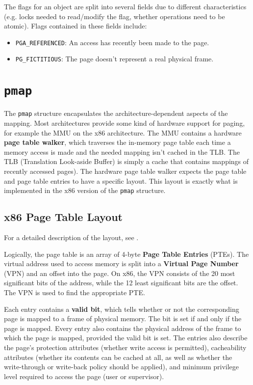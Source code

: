 \documentclass[shortabstract, english]{iithesis}
\begin{document}
The flags for an object are split into several fields due to different
characteristics (e.g. locks needed to read/modify the flag, whether operations
need to be atomic). Flags contained in these fields include:

\begin{itemize}
  \item \texttt{PGA_REFERENCED}: An access has recently been made to the page.
  \item \texttt{PG_FICTITIOUS}: The page doesn't represent a real physical frame.
\end{itemize}


\section{\texttt{pmap}}

The \texttt{pmap} structure encapsulates the architecture-dependent
aspects of the mapping. Most architectures provide some kind of hardware support
for paging, for example the MMU on the x86 architecture. The MMU contains a
hardware \textbf{page table walker}, which traverses the in-memory page table
each time a memory access is made and the needed mapping isn't cached in the
TLB. The TLB (Translation Look-aside Buffer) is simply a cache that contains
mappings of recently accessed pages). The hardware page table walker expects the
page table and page table entries to have a specific layout. This layout is
exactly what is implemented in the x86 version of the \texttt{pmap}
structure.

\subsection{x86 Page Table Layout}

For a detailed description of the layout, see \cite[Section~4.2]{bib:intel}.

Logically, the page table is an array of 4-byte \textbf{Page Table Entries}
(PTEs). The virtual address used to access memory is split into a
\textbf{Virtual Page Number} (VPN) and an offset into the page. On x86, the VPN
consists of the 20 most significant bits of the address, while the 12 least
significant bits are the offset. The VPN is used to find the appropriate PTE.

Each entry contains a \textbf{valid bit}, which tells whether or not the
corresponding page is mapped to a frame of physical memory. The bit is set if
and only if the page is mapped. Every entry also contains the physical address
of the frame to which the page is mapped, provided the valid bit is set. The
entries also describe the page's protection attributes (whether write access is
permitted), cacheability attributes (whether its contents can be cached at all,
as well as whether the write-through or write-back policy should be applied),
and minimum privilege level required to access the page (user or supervisor).
\end{document}
